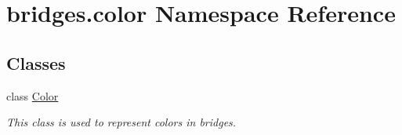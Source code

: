 \hypertarget{namespacebridges_1_1color}{}\section{bridges.\+color Namespace Reference}
\label{namespacebridges_1_1color}
\subsection*{Classes}
\begin{DoxyCompactItemize}
\item 
class \hyperlink{classbridges_1_1color_1_1_color}{Color}
\begin{DoxyCompactList}\small\item\em This class is used to represent colors in bridges. \end{DoxyCompactList}\end{DoxyCompactItemize}
